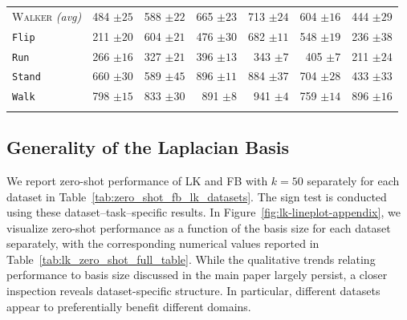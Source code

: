 \documentclass{article}
\theoremstyle{plain}
\theoremstyle{definition}
\theoremstyle{remark}
\begin{document}
\begin{table}
\begin{tabular}{l r r r r r r}
\addlinespace
\rowcolor{gray!15}
\textsc{Walker} \textit{(avg)} & 484 ${\scriptstyle \pm 25}$ & 588 ${\scriptstyle \pm 22}$ & 665 ${\scriptstyle \pm 23}$ & 713 ${\scriptstyle \pm 24}$ & 604 ${\scriptstyle \pm 16}$ & 444 ${\scriptstyle \pm 29}$ \\
\hspace{.5em} \texttt{Flip} & 211 ${\scriptstyle \pm 20}$ & 604 ${\scriptstyle \pm 21}$ & 476 ${\scriptstyle \pm 30}$ & 682 ${\scriptstyle \pm 11}$ & 548 ${\scriptstyle \pm 19}$ & 236 ${\scriptstyle \pm 38}$ \\
\hspace{.5em} \texttt{Run} & 266 ${\scriptstyle \pm 16}$ & 327 ${\scriptstyle \pm 21}$ & 396 ${\scriptstyle \pm 13}$ & 343 ${\scriptstyle \pm 7}$ & 405 ${\scriptstyle \pm 7}$ & 211 ${\scriptstyle \pm 24}$ \\
\hspace{.5em} \texttt{Stand} & 660 ${\scriptstyle \pm 30}$ & 589 ${\scriptstyle \pm 45}$ & 896 ${\scriptstyle \pm 11}$ & 884 ${\scriptstyle \pm 37}$ & 704 ${\scriptstyle \pm 28}$ & 433 ${\scriptstyle \pm 33}$ \\
\hspace{.5em} \texttt{Walk} & 798 ${\scriptstyle \pm 15}$ & 833 ${\scriptstyle \pm 30}$ & 891 ${\scriptstyle \pm 8}$ & 941 ${\scriptstyle \pm 4}$ & 759 ${\scriptstyle \pm 14}$ & 896 ${\scriptstyle \pm 16}$ \\
\addlinespace

\bottomrule
\end{tabular}
\end{table}



\subsection{Generality of the Laplacian Basis}
\label{sec:generality-appx}

We report zero-shot performance of LK and FB with $k=50$ separately for each dataset in Table~\ref{tab:zero_shot_fb_lk_datasets}. The sign test is conducted using these dataset–task–specific results.
In Figure~\ref{fig:lk-lineplot-appendix}, we visualize zero-shot performance as a function of the basis size for each dataset separately, with the corresponding numerical values reported in Table~\ref{tab:lk_zero_shot_full_table}. While the qualitative trends relating performance to basis size discussed in the main paper largely persist, a closer inspection reveals dataset-specific structure. In particular, different datasets appear to preferentially benefit different domains.
\end{document}

